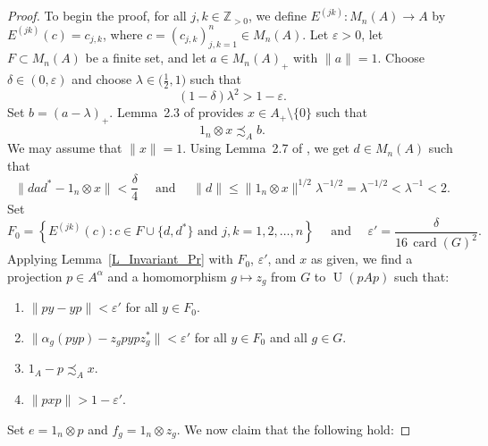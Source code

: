 \documentclass[10pt]{amsart}
\newcounter{TmpEnumi}
\numberwithin{equation}{section}
\theoremstyle{definition}
\newcommand{\dt}{\delta}
\newcommand{\ep}{\varepsilon}
\newcommand{\N}{{\mathbb{Z}}_{> 0}}
\newcommand{\id}{{\operatorname{id}}}
\newcommand{\card}{{\operatorname{card}}}
\newcommand{\U}{{\operatorname{U}}}
\newcommand{\hm}{homomorphism}
\newcommand{\Lem}[1]{Lemma~\ref{#1}}
\begin{document}
\begin{proof}
To begin the proof,
for all $j, k \in \N$, we define  $E^{(jk)} \colon M_n (A) \to A$ by
$E^{(jk)} (c) = c_{j, k}$,
where $c=(c_{j, k})_{j,k =1}^{n} \in M_n (A)$.
Let $\ep>0$, let $F \subset M_n (A)$ be a  finite set,
 and let $a \in M_n (A)_+$ with $\| a \|=1$.
Choose $\dt \in (0, \ep)$ and 
choose $\lambda \in \big(\tfrac{1}{2}, 1\big)$ such that 
\begin{equation}\label{EQ1.20200708}
(1 - \dt ) \lambda ^2 > 1- \ep.
\end{equation}
 Set $b = ( a - \lambda)_+$.
Lemma~2.3 of \cite{HO13} 
 provides $x \in A_+ \setminus \{0\}$ such that 
\begin{equation}\label{Eq1.20200706}
1_{n} \otimes x \precsim_A b.
\end{equation} 
We may assume that $\| x \|=1$.
Using Lemma~2.7 of  \cite{AGP19}, we get $d \in M_n (A)$ such that 
\begin{equation}\label{Eq1.2019.08.29}
\| d a d^* - 1_{n} \otimes x  \| < \frac{\dt}{4} 
\quad
\mbox { and }
\quad
\| d \| \leq \| 1_{n} \otimes x  \|^{1/2} \lambda ^{-1/2} = \lambda ^{-1/2} < \lambda ^{-1} < 2.
\end{equation}
Set 
\[
F_0 = \left\{ E^{(jk)} (c)  \colon c  \in F \cup \{ d, d^* \} \mbox{ and } j,k= 1, 2, \ldots, n \right\}
\quad
\mbox{ and }
\quad
\ep' = \frac{\dt}{16 \, \card (G)^2}.
\]
Applying \Lem{L_Invariant_Pr} with $F_0$, $\ep'$, and $x$ as given, 
we find a projection $p \in A^{\alpha}$ 
and a \hm{} $g \mapsto z_g$
from $G$ to $\U (p A p)$ such that:
\begin{enumerate}
\item\label{Tr_Ap_in.a.1}
$\| py - yp \| < \ep' $ for all $y \in F_0$.
\item \label{Tr_Ap_in.a.2}
$\| \alpha_g (pyp) - z_g pyp z^*_g\|< \ep'$ for all $y \in F_0$ and all $g \in G$.
\item \label{Tr_Ap_in.a.4}
$1_A - p \precsim_{A} x$.
\item \label{Tr_Ap_in.a.5}
$\| pxp\| > 1 - \ep'$.
\setcounter{TmpEnumi}{\value{enumi}}
\end{enumerate}  
Set 
$e=  1_{n} \otimes p$
 and 
$f_g= 1_{n} \otimes z_g$. 
We now claim that the following hold:
\end{proof}
\end{document}
